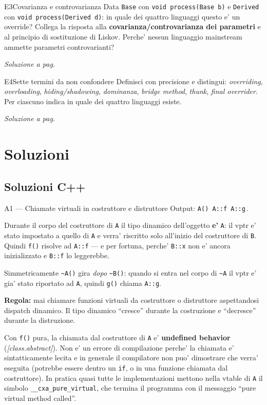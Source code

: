 \documentclass{report}
\newcommand{\code}[1]{\texttt{\small #1}}
\newcommand{\vaisol}[1]{%
    \par\vspace{4pt}\hfill{\footnotesize\itshape\color{gray}%
    Soluzione a pag.~\pageref{sol:#1}}%
}
\begin{document}
\begin{domanda}{E3}{Covarianza e controvarianza}
Data \code{Base} con \code{void process(Base b)} e \code{Derived} con
\code{void process(Derived d)}: in quale dei quattro linguaggi questo e' un
override? Collega la risposta alla \textbf{covarianza/controvarianza dei
parametri} e al principio di sostituzione di Liskov. Perche' nessun linguaggio
mainstream ammette parametri controvarianti?
\vaisol{E3}
\end{domanda}

\begin{domanda}{E4}{Sette termini da non confondere}
Definisci con precisione e distingui: \emph{overriding}, \emph{overloading},
\emph{hiding/shadowing}, \emph{dominanza}, \emph{bridge method}, \emph{thunk},
\emph{final overrider}. Per ciascuno indica in quale dei quattro linguaggi
esiste.
\vaisol{E4}
\end{domanda}

\chapter{Soluzioni}\label{ch:sol}

\section{Soluzioni C++}

\begin{soluzione}{A1 --- Chiamate virtuali in costruttore e distruttore}
\label{sol:A1}
Output: \code{A() A::f A::g}\,.

Durante il corpo del costruttore di \code{A} il tipo dinamico dell'oggetto
\textbf{e'} \code{A}: il vptr e' stato impostato a quello di \code{A} e verra'
riscritto solo all'inizio del costruttore di \code{B}. Quindi \code{f()}
risolve ad \code{A::f} --- e per fortuna, perche' \code{B::x} non e' ancora
inizializzato e \code{B::f} lo leggerebbe.

Simmetricamente \code{\~{}A()} gira \emph{dopo} \code{\~{}B()}: quando si entra
nel corpo di \code{\~{}A} il vptr e' gia' stato riportato ad \code{A}, quindi
\code{g()} chiama \code{A::g}.

\textbf{Regola:} mai chiamare funzioni virtuali da costruttore o distruttore
aspettandosi dispatch dinamico. Il tipo dinamico ``cresce'' durante la
costruzione e ``decresce'' durante la distruzione.

Con \code{f()} pura, la chiamata dal costruttore di \code{A} e'
\textbf{undefined behavior} (\emph{[class.abstract]}). Non e' un errore di
compilazione perche' la chiamata e' sintatticamente lecita e in generale il
compilatore non puo' dimostrare che verra' eseguita (potrebbe essere dentro un
\code{if}, o in una funzione chiamata dal costruttore). In pratica quasi tutte
le implementazioni mettono nella vtable di \code{A} il simbolo
\code{\_\_cxa\_pure\_virtual}, che termina il programma con il messaggio
``pure virtual method called''.
\end{soluzione}
\end{document}
